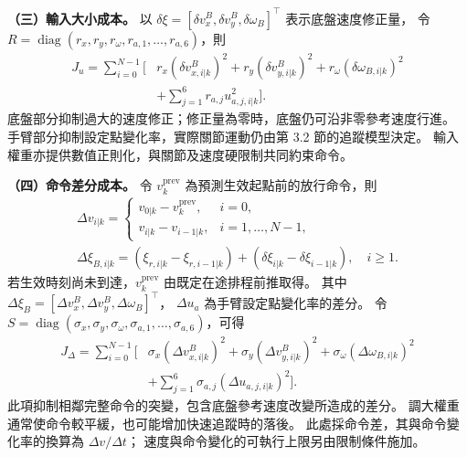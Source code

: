 \noindent\textbf{（三）輸入大小成本。}
以 $\delta\xi=[\delta v_x^B,\delta v_y^B,\delta\omega_B]^\top$ 表示底盤速度修正量，
令 $R=\operatorname{diag}(r_x,r_y,r_\omega,r_{a,1},\ldots,r_{a,6})$，則
\begin{equation}
    \begin{aligned}
        J_u=\sum_{i=0}^{N-1}\big[&
        r_x(\delta v_{x,i|k}^{B})^{2}
        +r_y(\delta v_{y,i|k}^{B})^{2}
        +r_\omega(\delta\omega_{B,i|k})^{2}\\
        &+\sum_{j=1}^{6}r_{a,j}u_{a,j,i|k}^{2}\big].
    \end{aligned}
    \label{eq:ch3_input_cost_expanded}
\end{equation}
底盤部分抑制過大的速度修正；修正量為零時，底盤仍可沿非零參考速度行進。
手臂部分抑制設定點變化率，實際關節運動仍由第 3.2 節的追蹤模型決定。
輸入權重亦提供數值正則化，與關節及速度硬限制共同約束命令。

\noindent\textbf{（四）命令差分成本。}
令 $v_k^{\mathrm{prev}}$ 為預測生效起點前的放行命令，則
\begin{equation}
    \begin{gathered}
        \Delta v_{i|k}=
        \begin{cases}
            v_{0|k}-v_k^{\mathrm{prev}},&i=0,\\
            v_{i|k}-v_{i-1|k},&i=1,\ldots,N-1,
        \end{cases}\\
        \Delta\xi_{B,i|k}=
        (\xi_{r,i|k}-\xi_{r,i-1|k})
        +(\delta\xi_{i|k}-\delta\xi_{i-1|k}),\quad i\geq1 .
    \end{gathered}
    \label{eq:ch3_command_difference_definition}
\end{equation}
若生效時刻尚未到達，$v_k^{\mathrm{prev}}$ 由既定在途排程前推取得。
其中 $\Delta\xi_B=[\Delta v_x^B,\Delta v_y^B,\Delta\omega_B]^\top$，
$\Delta u_a$ 為手臂設定點變化率的差分。
令 $S=\operatorname{diag}(\sigma_x,\sigma_y,\sigma_\omega,
\sigma_{a,1},\ldots,\sigma_{a,6})$，可得
\begin{equation}
    \begin{aligned}
        J_\Delta=\sum_{i=0}^{N-1}\big[&
        \sigma_x(\Delta v_{x,i|k}^{B})^{2}
        +\sigma_y(\Delta v_{y,i|k}^{B})^{2}
        +\sigma_\omega(\Delta\omega_{B,i|k})^{2}\\
        &+\sum_{j=1}^{6}\sigma_{a,j}(\Delta u_{a,j,i|k})^{2}\big].
    \end{aligned}
    \label{eq:ch3_smoothness_cost_expanded}
\end{equation}
此項抑制相鄰完整命令的突變，包含底盤參考速度改變所造成的差分。
調大權重通常使命令較平緩，也可能增加快速追蹤時的落後。
此處採命令差，其與命令變化率的換算為 $\Delta v/\Delta t$；
速度與命令變化的可執行上限另由限制條件施加。

